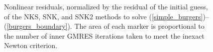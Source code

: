 \begin{figure}
  \caption{Nonlinear residuals, normalized by the residual of the initial guess, of the NKS, SNK, and SNK2 methods to solve (\ref{simple_burgers})--(\ref{burgers_boundary}). The area of each marker is proportional to the number of inner GMRES iterations taken to meet the inexact Newton criterion.}
  \label{burgers_simp_test}
\end{figure}

